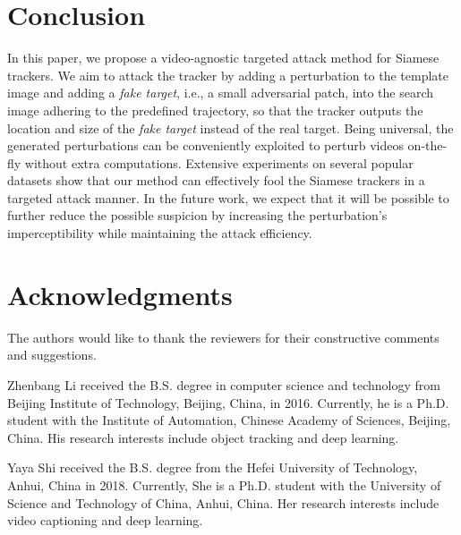 \documentclass[journal]{IEEEtran}
\newcommand{\ie}{i.e.}
\begin{document}
\section{Conclusion}
In this paper, we propose a video-agnostic targeted attack method for Siamese trackers. We aim to attack the tracker by adding a perturbation to the template image and adding a \textit{fake target}, \ie, a small adversarial patch, into the search image adhering to the predefined trajectory, so that the tracker outputs the location and size of the \textit{fake target} instead of the real target. Being universal, the generated perturbations can be conveniently exploited to perturb videos on-the-fly without extra computations. Extensive experiments on several popular datasets show that our method can effectively fool the Siamese trackers in a targeted attack manner. In the future work, we expect that it will be possible to further reduce the possible suspicion by increasing the perturbation's imperceptibility while maintaining the attack efficiency.

\section*{Acknowledgments}
The authors would like to thank the reviewers for their constructive comments and suggestions.

\normalem



\begin{IEEEbiography}
{Zhenbang Li}
received the B.S. degree in computer science and technology from Beijing Institute of Technology, Beijing, China, in 2016. Currently, he is a Ph.D. student with the Institute of Automation, Chinese Academy of Sciences, Beijing, China. His research interests include object tracking and deep learning.
\end{IEEEbiography}

\begin{IEEEbiography}
  {Yaya Shi}
  received the B.S. degree from the Hefei University of Technology, Anhui, China in 2018. Currently, She is a Ph.D. student with the University of Science and Technology of China, Anhui, China. Her research interests include video captioning and deep learning.
\end{IEEEbiography}
\vspace{-5mm}
\end{document}
